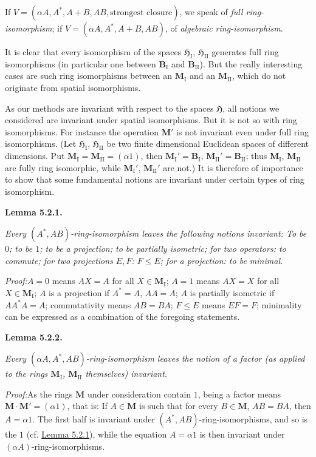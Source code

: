 \documentclass[12pt,b5paper,twoside]{article}
\newcommand{\Hspace}{\mathfrak H}
\newcommand{\M}{\mathbf M}
\newcommand{\B}{\mathbf B}
\newcommand{\Lemma}[1]{%
  \par\smallskip\noindent\phantomsection\label{lem:#1}\textbf{Lemma #1.}\enspace
}
\newcommand{\Proof}{\par\noindent\textit{Proof:}\enspace}
\newcommand{\lemref}[1]{\hyperref[lem:#1]{Lemma #1}}
\begin{document}
If $V=(\alpha A,A^*,A+B,AB,\text{strongest closure})$, we speak of
\emph{full ring-isomorphism}; if $V=(\alpha A,A^*,A+B,AB)$, of
\emph{algebraic ring-isomorphism}.

It is clear that every isomorphism of the spaces $\Hspace_{\mathrm I}$,
$\Hspace_{\mathrm{II}}$ generates full ring isomorphisms (in particular one
between $\B_{\mathrm I}$ and $\B_{\mathrm{II}}$). But the really interesting
cases are such ring isomorphisms between an $\M_{\mathrm I}$ and an
$\M_{\mathrm{II}}$, which do not originate from spatial isomorphisms.

As our methods are invariant with respect to the spaces $\Hspace$, all notions
we considered are invariant under spatial isomorphisms. But it is not so with
ring isomorphisms. For instance the operation $\M'$ is not invariant even under
full ring isomorphisms. (Let $\Hspace_{\mathrm I}$,
$\Hspace_{\mathrm{II}}$ be two finite dimensional Euclidean spaces of different
dimensions. Put $\M_{\mathrm I}=\M_{\mathrm{II}}=(\alpha1)$, then
$\M_{\mathrm I}'=\B_{\mathrm I}$,
$\M_{\mathrm{II}}'=\B_{\mathrm{II}}$; thus $\M_{\mathrm I}$,
$\M_{\mathrm{II}}$ are fully ring isomorphic, while $\M_{\mathrm I}'$,
$\M_{\mathrm{II}}'$ are not.) It is therefore of importance to show that some
fundamental notions are invariant under certain types of ring isomorphism.

\Lemma{5.2.1}
\emph{Every $(A^*,AB)$-ring-isomorphism leaves the following notions
invariant: To be $0$; to be $1$; to be a projection; to be partially isometric;
for two operators: to commute; for two projections $E,F$: $F\leq E$; for a
projection: to be minimal.}

\Proof $A=0$ means $AX=A$ for all $X\in\M_{\mathrm I}$; $A=1$ means
$AX=X$ for all $X\in\M_{\mathrm I}$; $A$ is a projection if $A^*=A$,
$AA=A$; $A$ is partially isometric if $AA^*A=A$; commutativity means
$AB=BA$; $F\leq E$ means $EF=F$; minimality can be expressed as a
combination of the foregoing statements.

\Lemma{5.2.2}
\emph{Every $(\alpha A,A^*,AB)$-ring-isomorphism leaves the notion of a
factor (as applied to the rings $\M_{\mathrm I}$, $\M_{\mathrm{II}}$
themselves) invariant.}

\Proof As the rings $\M$ under consideration contain $1$, being a factor means
$\M\cdot\M'=(\alpha1)$, that is: If $A\in\M$ is such that for every
$B\in\M$, $AB=BA$, then $A=\alpha1$. The first half is invariant under
$(A^*,AB)$-ring-isomorphisms, and so is the $1$ (cf. \lemref{5.2.1}), while
the equation $A=\alpha1$ is then invariant under
$(\alpha A)$-ring-isomorphisms.
\end{document}
